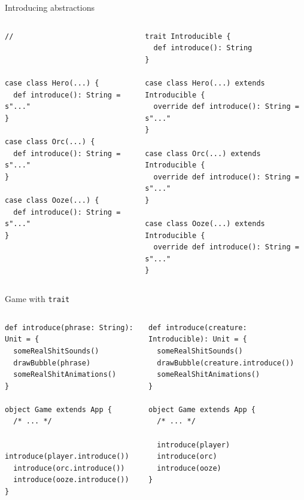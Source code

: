\documentclass[presentation,aspectratio=169,smaller]{beamer}
\begin{document}
\begin{frame}[label={sec:org0c12b5a},fragile]{Introducing abstractions}
 \begin{columns}
\begin{column}[t]{0.5\columnwidth}
\begin{verbatim}
//



case class Hero(...) {
  def introduce(): String = s"..."
}

case class Orc(...) {
  def introduce(): String = s"..."
}

case class Ooze(...) {
  def introduce(): String = s"..."
}
\end{verbatim}

\pause
\end{column}

\begin{column}[t]{0.5\columnwidth}
\begin{verbatim}
trait Introducible {
  def introduce(): String
}

case class Hero(...) extends Introducible {
  override def introduce(): String = s"..."
}

case class Orc(...) extends Introducible {
  override def introduce(): String = s"..."
}

case class Ooze(...) extends Introducible {
  override def introduce(): String = s"..."
}
\end{verbatim}
\end{column}
\end{columns}
\end{frame}

\begin{frame}[label={sec:org9c57706},fragile]{Game with \texttt{trait}}
 \begin{columns}
\begin{column}[t]{0.5\columnwidth}
\begin{verbatim}
def introduce(phrase: String): Unit = {
  someRealShitSounds()
  drawBubble(phrase)
  someRealShitAnimations()
}

object Game extends App {
  /* ... */

  introduce(player.introduce())
  introduce(orc.introduce())
  introduce(ooze.introduce())
}
\end{verbatim}

\pause
\end{column}

\begin{column}[t]{0.5\columnwidth}
\begin{verbatim}
def introduce(creature: Introducible): Unit = {
  someRealShitSounds()
  drawBubble(creature.introduce())
  someRealShitAnimations()
}

object Game extends App {
  /* ... */

  introduce(player)
  introduce(orc)
  introduce(ooze)
}
\end{verbatim}
\end{column}
\end{columns}
\end{frame}
\end{document}
